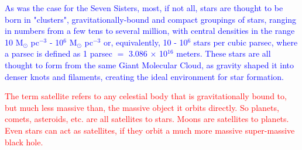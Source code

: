 \documentclass[main.tex]{subfiles}
\begin{document}
\begin{tcolorbox}[sharp corners, colback=blue!30, colframe=blue!80!blue, title=Star Clusters$^{23}$]
\par \textcolor{blue} {As was the case for the Seven Sisters, most, if not all, stars are thought to be born in "clusters", gravitationally-bound and compact groupings of stars, ranging in numbers from a few tens to several million, with central densities in the range 10 M$_{\odot}$ pc$^{-3}$ - 10$^6$ M$_{\odot}$ pc$^{-3}$ or, equivalently, 10 - 10$^6$ stars per cubic parsec, where a parsec is defined as 1 parsec $=$ 3.086 $\times$ 10$^{16}$ meters.  These stars are all thought to form from the same Giant Molecular Cloud, as gravity shaped it into denser knots and filaments, creating the ideal environment for star formation.}  
\end{tcolorbox} 

\begin{tcolorbox}[sharp corners, colback=red!30, colframe=red!80!blue, title=Satellites$^{23}$]
\par \textcolor{red} {The term satellite refers to any celestial body that is gravitationally bound to, but much less massive than, the massive object it orbits directly.  So planets, comets, asteroids, etc. are all satellites to stars.  Moons are satellites to planets.  Even stars can act as satellites, if they orbit a much more massive super-massive black hole.} 
\end{tcolorbox} 
\end{document}
